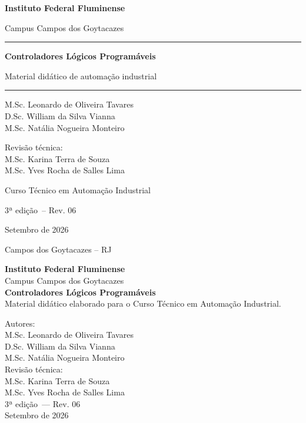 \documentclass[11pt,a4paper,oneside]{book}
\newcommand{\obraTitulo}{Controladores Lógicos Programáveis}
\newcommand{\obraSubtitulo}{Material didático de automação industrial}
\newcommand{\obraInstituicao}{Instituto Federal Fluminense}
\newcommand{\obraCampus}{Campus Campos dos Goytacazes}
\newcommand{\obraCurso}{Curso Técnico em Automação Industrial}
\newcommand{\obraAutores}{M.Sc. Leonardo de Oliveira Tavares\\%
  D.Sc. William da Silva Vianna\\%
  M.Sc. Natália Nogueira Monteiro}
\newcommand{\obraRevisor}{M.Sc. Karina Terra de Souza\\%
  M.Sc. Yves Rocha de Salles Lima}
\newcommand{\obraEdicao}{3ª edição}
\newcommand{\obraRevisao}{Rev. 06}
\newcommand{\obraData}{Setembro de 2026}
\newcommand{\obraCidade}{Campos dos Goytacazes -- RJ}
\begin{document}
\begin{titlepage}
  \centering
  \vspace*{1cm}
  {\large\bfseries \obraInstituicao\par}
  {\small \obraCampus\par}
  \vspace{1.2cm}
  \rule{\linewidth}{0.5pt}\par
  \vspace{0.8cm}
  {\Huge\bfseries\color{iffazul} \obraTitulo\par}
  \vspace{0.4cm}
  {\large \obraSubtitulo\par}
  \vspace{0.8cm}
  \rule{\linewidth}{0.5pt}\par
  \vfill
  {\large \obraAutores\par}
  \vspace{0.4cm}
  {\small Revisão técnica:\\[0.15cm] \obraRevisor\par}
  \vspace{1.2cm}
  {\obraCurso\par}
  \vspace{0.3cm}
  {\obraEdicao\ -- \obraRevisao\par}
  {\obraData\par}
  \vfill
  {\obraCidade\par}
\end{titlepage}

\thispagestyle{empty}
\begin{center}
  {\large\bfseries \obraInstituicao}\\[0.2cm]
  {\small \obraCampus}\\[2cm]
  {\Large\bfseries \obraTitulo}\\[0.5cm]
  {\small Material didático elaborado para o \obraCurso.}\\[2cm]
\end{center}
\begin{flushright}
  \begin{minipage}{0.55\textwidth}
    \small Autores:\\ \obraAutores\\[0.6cm]
    Revisão técnica:\\ \obraRevisor\\[0.8cm]
    \obraEdicao\ --- \obraRevisao\\
    \obraData
  \end{minipage}
\end{flushright}
\vfill
\clearpage
\end{document}
